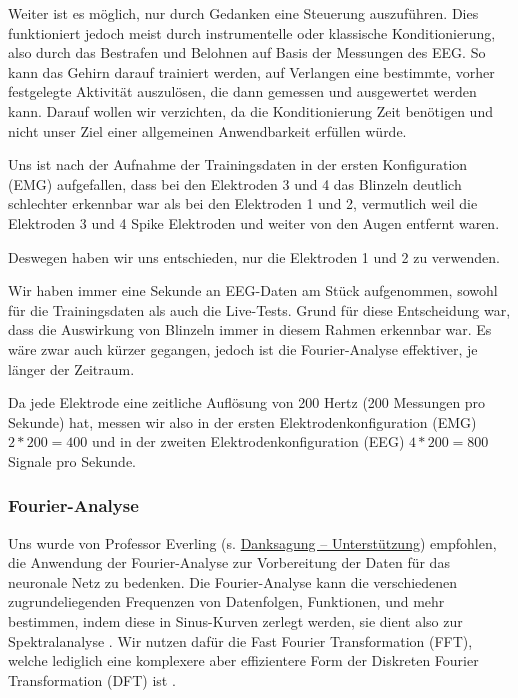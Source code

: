 \documentclass[11pt]{scrartcl}
\begin{document}
	Weiter ist es möglich, nur durch Gedanken eine Steuerung auszuführen. Dies funktioniert jedoch meist durch instrumentelle oder klassische Konditionierung, also durch das Bestrafen und Belohnen auf Basis der Messungen des EEG. So kann das Gehirn darauf trainiert werden, auf Verlangen eine bestimmte, vorher festgelegte Aktivität auszulösen, die dann gemessen und ausgewertet werden kann. \cite{BCIChaudhary} Darauf wollen wir verzichten, da die Konditionierung Zeit benötigen und nicht unser Ziel einer allgemeinen Anwendbarkeit erfüllen würde.


	Uns ist nach der Aufnahme der Trainingsdaten in der ersten Konfiguration (EMG) aufgefallen, dass bei den Elektroden 3 und 4 das Blinzeln deutlich schlechter erkennbar war als bei den Elektroden 1 und 2, vermutlich weil die Elektroden 3 und 4 Spike Elektroden und weiter von den Augen entfernt waren.

	Deswegen haben wir uns entschieden, nur die Elektroden 1 und 2 zu verwenden.

	Wir haben immer eine Sekunde an EEG-Daten am Stück aufgenommen, sowohl für die Trainingsdaten als auch die Live-Tests. Grund für diese Entscheidung war, dass die Auswirkung von Blinzeln immer in diesem Rahmen erkennbar war. Es wäre zwar auch kürzer gegangen, jedoch ist die Fourier-Analyse effektiver, je länger der Zeitraum.

	Da jede Elektrode eine zeitliche Auflösung von 200 Hertz (200 Messungen pro Sekunde) hat, messen wir also in der ersten Elektrodenkonfiguration (EMG) $2 * 200 = 400$ und in der zweiten Elektrodenkonfiguration (EEG) $4 * 200 = 800$ Signale pro Sekunde.

	\subsubsection{Fourier-Analyse}
	
	Uns wurde von Professor Everling (s. \hyperref[Unterstuetzung]{Danksagung -- Unterstützung}) empfohlen, die Anwendung der Fourier-Analyse zur Vorbereitung der Daten für das neuronale Netz zu bedenken. Die Fourier-Analyse kann die verschiedenen zugrundeliegenden Frequenzen von Datenfolgen, Funktionen, und mehr bestimmen, indem diese in Sinus-Kurven zerlegt werden, sie dient also zur Spektralanalyse \cite{3b1b:fft}. Wir nutzen dafür die Fast Fourier Transformation (FFT), welche lediglich eine komplexere aber effizientere Form der Diskreten Fourier Transformation (DFT) ist \cite{FFT-DFT}.
\end{document}

